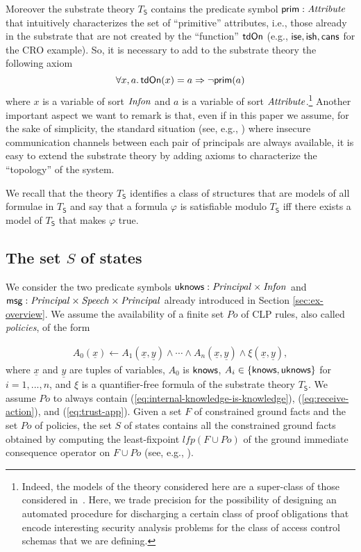 \documentclass[conference]{llncs}
\newcommand{\canstoredoc}{\ensuremath \mathsf{cans}}
\newcommand{\ishead}{\ensuremath \mathsf{ish}}
\newcommand{\isemployee}{\ensuremath \mathsf{ise}}
\newcommand{\know}{\ensuremath \mathsf{knows}}
\newcommand{\msg}{\ensuremath \mathsf{msg}}
\newcommand{\principal}{\ensuremath \mathit{Principal}}
\newcommand{\infon}{\ensuremath \mathit{Infon}}
\newcommand{\attribute}{\ensuremath \mathit{Attribute}}
\newcommand{\speech}{\ensuremath \mathit{Speech}}
\newcommand{\knowzero}{\ensuremath \mathsf{uknows}}
\newcommand{\tdOn}{\ensuremath \mathsf{tdOn}}
\newcommand{\CRO}{CRO}
\begin{document}
Moreover the substrate theory $T_{\mathsf{S}}$ contains the
predicate symbol $\mathsf{prim}:\attribute$ 
that intuitively characterizes the set of ``primitive'' attributes, i.e., those already in the substrate that are not created by the ``function'' $\tdOn$ (e.g., $\isemployee, \ishead, \canstoredoc$ for the \CRO{} example).
So, it is necessary to add to the substrate theory the  following axiom $$ \forall x, a.\,
\tdOn(x)=a\Rightarrow \neg \mathsf{prim}(a)$$ where $x$ is a variable of
sort $\infon$ and $a$ is a variable of sort
$\attribute$.\footnote{Indeed, the models of the theory considered here
are a super-class of those considered in~\cite{GurevichNeeman-dkal}.
Here, we trade precision for the possibility of designing an automated
procedure for discharging a certain class of proof obligations that
encode interesting security analysis problems for the class of access
control schemas that we are defining.} 
Another important aspect we want to remark is that, even if in this paper we assume, for the sake of simplicity,
the standard situation (see, e.g., \cite{MauSch96}) where insecure communication channels
between each pair of principals are always available, it is easy to extend the substrate theory
by adding axioms to characterize the ``topology'' of the system. 

We recall that the theory
$T_{\mathsf{S}}$ identifies a class of structures that are models of
all formulae in $T_{\mathsf{S}}$ and say that a formula $\varphi$ is
satisfiable modulo $T_{\mathsf{S}}$ iff there exists a model of
$T_{\mathsf{S}}$ that makes $\varphi$ true.

\subsection{The set $S$ of states} 
\label{subsec:setofstates}
We consider the two predicate symbols
$\knowzero : \principal \times \infon$ and $\msg : \principal \times
\speech \times \principal$ already introduced in Section \ref{sec:ex-overview}. 
We assume the availability of a finite set $\mathit{Po}$ of CLP rules, also called
\emph{policies}, of the form

\begin{eqnarray}
  \label{eq:policy-rule}
  A_0(\underline{x}) \leftarrow 
  A_1(\underline{x},\underline{y}) \wedge \cdots \wedge 
  A_n(\underline{x},\underline{y}) \wedge
  \xi(\underline{x},\underline{y}) ,
\end{eqnarray}
where $\underline{x}$ and $\underline{y}$ are tuples of variables,
$A_0$ is $\know$, $A_i\in \{ \know,\knowzero\}$ for $i=1, ..., n$, and
$\xi$ is a quantifier-free formula of the substrate theory
$T_{\mathsf{S}}$.  We assume $\mathit{Po}$ to always contain
(\ref{eq:internal-knowledge-is-knowledge}), (\ref{eq:receive-action}),
and (\ref{eq:trust-app}).  Given a set $F$ of constrained ground facts
and the set $\mathit{Po}$ of policies, the set $S$ of states contains
all the constrained ground facts obtained by computing the
least-fixpoint $\mathit{lfp}(F\cup\mathit{Po})$ of the ground
immediate consequence operator on $F\cup \mathit{Po}$ (see,
e.g., \cite{constraintdatalog}).
\end{document}
